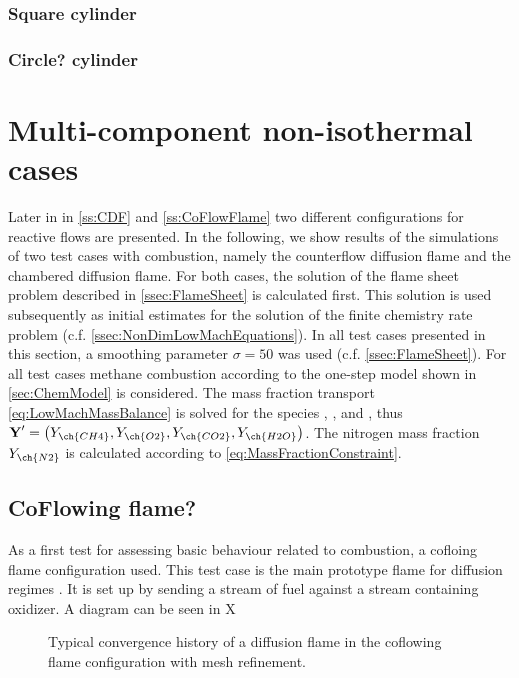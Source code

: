 \subsubsection{Square cylinder}
\blindtext[5]
\subsubsection{Circle? cylinder}
\blindtext[5]



\section{Multi-component non-isothermal cases}\label{sec:MultCompNonIsothermCase}
Later in in \cref{ss:CDF} and \cref{ss:CoFlowFlame} two different configurations for reactive flows are presented. 
In the following, we show results of the simulations of two test cases with combustion, namely the counterflow diffusion flame and the chambered diffusion flame. For both cases, the solution of the flame sheet problem described in \cref{ssec:FlameSheet} is calculated first. This solution is used subsequently as initial estimates for the solution of the finite chemistry rate problem (c.f. \cref{ssec:NonDimLowMachEquations}). In all test cases presented in this section, a smoothing parameter $\sigma = 50$ was used (c.f. \cref{ssec:FlameSheet}). For all test cases methane combustion according to the one-step model shown in \cref{sec:ChemModel} is considered. The mass fraction transport \cref{eq:LowMachMassBalance} is solved for the species , ,  and , thus $\vec{Y}' = \left(Y_{\ch{CH4}},Y_{\ch{O2}},Y_{\ch{CO2}},Y_{\ch{H2O}}\right)$. The nitrogen mass fraction $Y_{\ch{N2}}$ is calculated according to \cref{eq:MassFractionConstraint}. 



\subsection{CoFlowing flame?}

As a first test for assessing basic behaviour related to combustion, a cofloing flame configuration used. This test case is the main prototype flame for diffusion regimes \cite{poinsotTheoreticalNumericalCombustion2005}. It is set up by sending a stream of fuel against a stream containing oxidizer. A diagram can be seen in X
\begin{figure}[t!]
	\centering
	\caption{Typical convergence history of a diffusion flame in the coflowing flame configuration with mesh refinement.}
	\label{fig:CoFlow_ConvergenceStory}
\end{figure} 

